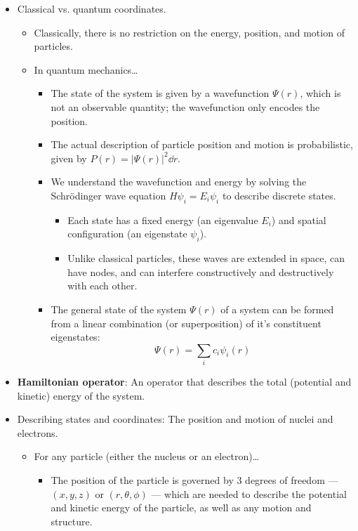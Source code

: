 \documentclass[../notes.tex]{subfiles}
\begin{document}
\begin{itemize}
    \item Classical vs. quantum coordinates.
    \begin{itemize}
        \item Classically, there is no restriction on the energy, position, and motion of particles.
        \item In quantum mechanics\dots
        \begin{itemize}
            \item The state of the system is given by a wavefunction $\Psi(r)$, which is not an observable quantity; the wavefunction only encodes the position.
            \item The actual description of particle position and motion is probabilistic, given by $P(r)=|\Psi(r)|^2\dd{r}$.
            \item We understand the wavefunction and energy by solving the Schr\"{o}dinger wave equation $H\psi_i=E_i\psi_i$ to describe discrete states.
            \begin{itemize}
                \item Each state has a fixed energy (an eigenvalue $E_i$) and spatial configuration (an eigenstate $\psi_i$).
                \item Unlike classical particles, these waves are extended in space, can have nodes, and can interfere constructively and destructively with each other.
            \end{itemize}
            \item The general state of the system $\Psi(r)$ of a system can be formed from a linear combination (or superposition) of it's constituent eigenstates:
            \begin{equation*}
                \Psi(r) = \sum_ic_i\psi_i(r)
            \end{equation*}
        \end{itemize}
    \end{itemize}
    \item \textbf{Hamiltonian operator}: An operator that describes the total (potential and kinetic) energy of the system.
    \item Describing states and coordinates: The position and motion of nuclei and electrons.
    \begin{itemize}
        \item For any particle (either the nucleus or an electron)\dots
        \begin{itemize}
            \item The position of the particle is governed by 3 degrees of freedom --- $(x,y,z)$ or $(r,\theta,\phi)$ --- which are needed to describe the potential and kinetic energy of the particle, as well as any motion and structure.

\end{itemize}
\end{itemize}
\end{itemize}
\end{document}
